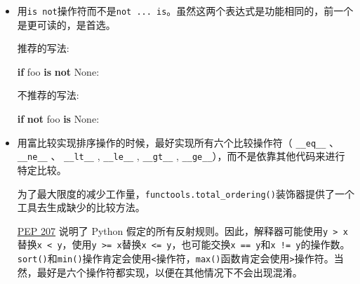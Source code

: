 \documentclass[ignorenonframetext,9pt]{beamer}
\newenvironment{Shaded}{}{}
\newcommand{\ControlFlowTok}[1]{\textcolor[rgb]{0.00,0.44,0.13}{\textbf{#1}}}
\newcommand{\KeywordTok}[1]{\textcolor[rgb]{0.00,0.44,0.13}{\textbf{#1}}}
\newcommand{\NormalTok}[1]{#1}
\newcommand{\VariableTok}[1]{\textcolor[rgb]{0.10,0.09,0.49}{#1}}
\begin{document}
\begin{frame}[fragile]

\begin{itemize}
\item
  用\texttt{is\ not}操作符而不是\texttt{not\ ...\ is}。虽然这两个表达式是功能相同的，前一个是更可读的，是首选。

  推荐的写法:

\begin{Shaded}
\begin{Highlighting}[]
\ControlFlowTok{if}\NormalTok{ foo }\KeywordTok{is} \KeywordTok{not} \VariableTok{None}\NormalTok{:}
\end{Highlighting}
\end{Shaded}

  不推荐的写法:

\begin{Shaded}
\begin{Highlighting}[]
\ControlFlowTok{if} \KeywordTok{not}\NormalTok{ foo }\KeywordTok{is} \VariableTok{None}\NormalTok{:}
\end{Highlighting}
\end{Shaded}
\end{itemize}

\end{frame}

\begin{frame}[fragile]

\begin{itemize}
\item
  用富比较实现排序操作的时候，最好实现所有六个比较操作符（
  \texttt{\_\_eq\_\_} 、 \texttt{\_\_ne\_\_} 、 \texttt{\_\_lt\_\_} ,
  \texttt{\_\_le\_\_} , \texttt{\_\_gt\_\_} ,
  \texttt{\_\_ge\_\_}），而不是依靠其他代码来进行特定比较。

  为了最大限度的减少工作量，\texttt{functools.total\_ordering()}装饰器提供了一个工具去生成缺少的比较方法。

  \href{https://www.python.org/dev/peps/pep-0207}{PEP 207} 说明了 Python
  假定的所有反射规则。因此，解释器可能使用\texttt{y\ \textgreater{}\ x}替换\texttt{x\ \textless{}\ y}，使用\texttt{y\ \textgreater{}=\ x}替换\texttt{x\ \textless{}=\ y}，也可能交换\texttt{x\ ==\ y}和\texttt{x\ !=\ y}的操作数。\texttt{sort()}和\texttt{min()}操作肯定会使用\texttt{\textless{}}操作符，\texttt{max()}函数肯定会使用\texttt{\textgreater{}}操作符。当然，最好是六个操作符都实现，以便在其他情况下不会出现混淆。
\end{itemize}

\end{frame}
\end{document}
